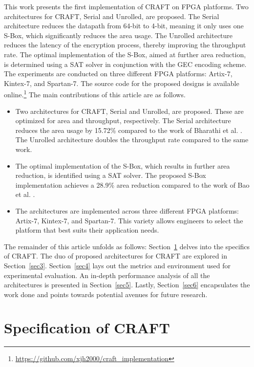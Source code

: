 \documentclass[final,5p,times,twocolumn]{elsarticle}
\begin{document}
This work presents the first implementation of CRAFT on FPGA platforms.
Two architectures for CRAFT, Serial and Unrolled, are proposed. The Serial architecture reduces the datapath from 64-bit to 4-bit, meaning it only uses one S-Box, which significantly reduces the area usage.
The Unrolled architecture reduces the latency of the encryption process, thereby improving the throughput rate.
The optimal implementation of the S-Box, aimed at further area reduction, is determined using a SAT solver in conjunction with the GEC encoding scheme.
The experiments are conducted on three different FPGA platforms: Artix-7, Kintex-7, and Spartan-7.
The source code for the proposed designs is available online.\footnote{\url{https://github.com/xjh2000/craft_implementation}}
The main contributions of this article are as follows.
\begin{itemize}
    \item Two architectures for CRAFT, Serial and Unrolled, are proposed. These are optimized for area and throughput, respectively.
          The Serial architecture reduces the area usage by 15.72\% compared to the work of Bharathi et al. \cite{Bharathi2022}.
          The Unrolled architecture doubles the throughput rate compared to the same work.
    \item The optimal implementation of the S-Box, which results in further area reduction, is identified using a SAT solver.
          The proposed S-Box implementation achieves a 28.9\% area reduction compared to the work of Bao et al. \cite{bao2019peigen}.
    \item The architectures are implemented across three different FPGA platforms: Artix-7, Kintex-7, and Spartan-7. This variety allows engineers to select the platform that best suits their application needs.
\end{itemize}


The remainder of this article unfolds as follows: Section~\ref{sec2} delves into the specifics of CRAFT. The duo of proposed architectures for CRAFT are explored in Section~\ref{sec3}. Section~\ref{sec4} lays out the metrics and environment used for experimental evaluation. An in-depth performance analysis of all the architectures is presented in Section~\ref{sec5}. Lastly, Section~\ref{sec6} encapsulates the work done and points towards potential avenues for future research.

\section{Specification of CRAFT}\label{sec2}
\end{document}
